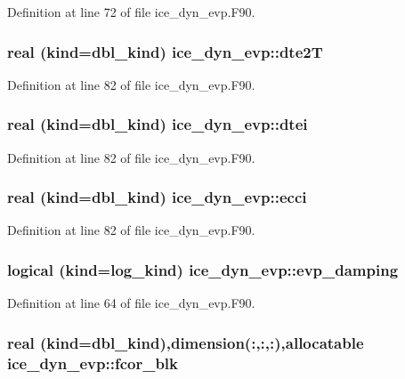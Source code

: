 Definition at line 72 of file ice\_\-dyn\_\-evp.F90.\hypertarget{namespaceice__dyn__evp_a48f316b1e91781f36049db60d9d57d82}{
\subsubsection[{dte2T}]{\setlength{\rightskip}{0pt plus 5cm}real (kind=dbl\_\-kind) {\bf ice\_\-dyn\_\-evp::dte2T}}}
\label{namespaceice__dyn__evp_a48f316b1e91781f36049db60d9d57d82}


Definition at line 82 of file ice\_\-dyn\_\-evp.F90.\hypertarget{namespaceice__dyn__evp_a17c3a9aa810fbb29c6eda85ab2fb24dd}{
\subsubsection[{dtei}]{\setlength{\rightskip}{0pt plus 5cm}real (kind=dbl\_\-kind) {\bf ice\_\-dyn\_\-evp::dtei}}}
\label{namespaceice__dyn__evp_a17c3a9aa810fbb29c6eda85ab2fb24dd}


Definition at line 82 of file ice\_\-dyn\_\-evp.F90.\hypertarget{namespaceice__dyn__evp_a74e9b0358ea08911b4d29dec60340f51}{
\subsubsection[{ecci}]{\setlength{\rightskip}{0pt plus 5cm}real (kind=dbl\_\-kind) {\bf ice\_\-dyn\_\-evp::ecci}}}
\label{namespaceice__dyn__evp_a74e9b0358ea08911b4d29dec60340f51}


Definition at line 82 of file ice\_\-dyn\_\-evp.F90.\hypertarget{namespaceice__dyn__evp_a79e497f85715426c0f09259d8fe336ed}{
\subsubsection[{evp\_\-damping}]{\setlength{\rightskip}{0pt plus 5cm}logical (kind=log\_\-kind) {\bf ice\_\-dyn\_\-evp::evp\_\-damping}}}
\label{namespaceice__dyn__evp_a79e497f85715426c0f09259d8fe336ed}


Definition at line 64 of file ice\_\-dyn\_\-evp.F90.\hypertarget{namespaceice__dyn__evp_a1eeebacd4068f5555d3f66448b8acc64}{
\subsubsection[{fcor\_\-blk}]{\setlength{\rightskip}{0pt plus 5cm}real (kind=dbl\_\-kind),dimension(:,:,:),allocatable {\bf ice\_\-dyn\_\-evp::fcor\_\-blk}}}
\label{namespaceice__dyn__evp_a1eeebacd4068f5555d3f66448b8acc64}


